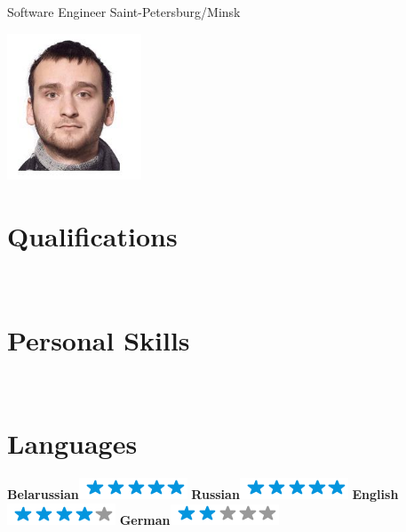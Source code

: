 \documentclass[]{friggeri-cv}
\begin{document}
      {Software Engineer}
      {Saint-Petersburg/Minsk}


\begin{aside}
  \includegraphics[width=4cm]{img/Artsiom_Kaltovich.jpg}
    ~
  \section{Qualifications}
    ~
  \section{Personal Skills}
    ~
    \section{Languages}
        \textbf{Belarussian}\includegraphics[scale=0.40]{img/5stars.png}
        \textbf{Russian}\includegraphics[scale=0.40]{img/5stars.png}
        \textbf{English}\includegraphics[scale=0.40]{img/4stars.png}
        \textbf{German}\includegraphics[scale=0.40]{img/2stars.png}
    ~

\end{aside}
\end{document}
